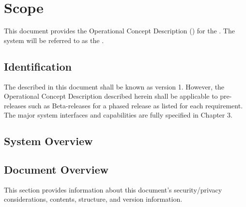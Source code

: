
\chapter{Scope}
\label{loc:Scope}
% 

This document provides the Operational Concept Description (\OCD) for the \ThisSystem. 
The system will be referred to as the \ThisSys.

\section{Identification}
\label{loc:Identification}
% 

The \ThisSystem described in this document shall be known as \ThisSys version 1.
However, the Operational Concept Description {\OCD} described herein shall be applicable to pre-releases such as Beta-releases for a phased release as listed for each requirement.
The major system interfaces and capabilities are fully specified in Chapter 3.

\section{System Overview}
\label{loc:SystemOverview}
% 






\newpage
\section{Document Overview}
\label{loc:DocumentOverview}
% 

This section provides information about this document's security/privacy considerations, contents, structure, and version information.

% 

% 

% 
